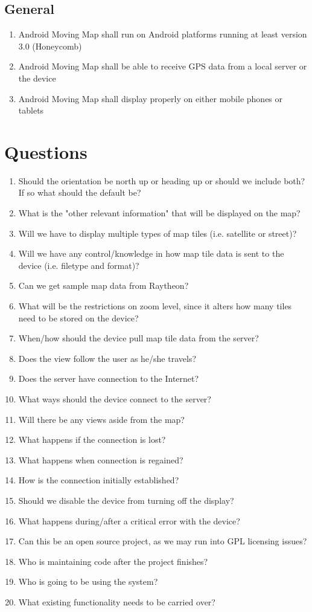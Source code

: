 \documentclass{article}
\begin{document}
\subsection{General}

\begin{enumerate}[label*=2.1.\arabic*]
\item Android Moving Map shall run on Android platforms running at least version 3.0 (Honeycomb)
\item Android Moving Map shall be able to receive GPS data from a local server or the device
\item Android Moving Map shall display properly on either mobile phones or tablets
\end{enumerate}

\clearpage

\section{Questions}

\begin{enumerate}[label*=3.\arabic*]
\item Should the orientation be north up or heading up or should we include both? If so what should the default be?
\item What is the "other relevant information" that will be displayed on the map?
\item Will we have to display multiple types of map tiles (i.e. satellite or street)?
\item Will we have any control/knowledge in how map tile data is sent to the device (i.e. filetype and format)?
\item Can we get sample map data from Raytheon?
\item What will be the restrictions on zoom level, since it alters how many tiles need to be stored on the device?
\item When/how should the device pull map tile data from the server?
\item Does the view follow the user as he/she travels?
\item Does the server have connection to the Internet?
\item What ways should the device connect to the server?
\item Will there be any views aside from the map?
\item What happens if the connection is lost?
\item What happens when connection is regained?
\item How is the connection initially established?
\item Should we disable the device from turning off the display?
\item What happens during/after a critical error with the device?
\item Can this be an open source project, as we may run into GPL licensing issues?
\item Who is maintaining code after the project finishes?
\item Who is going to be using the system?
\item What existing functionality needs to be carried over?
\end{enumerate}
\end{document}
